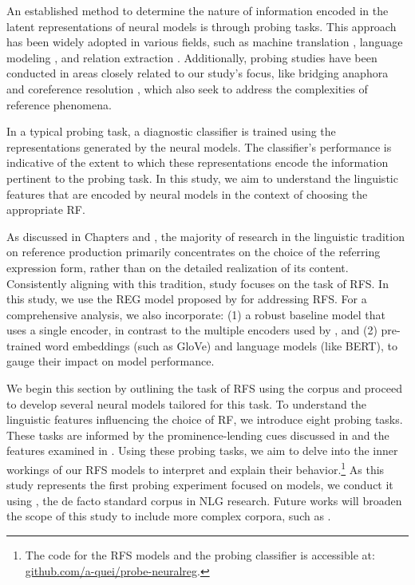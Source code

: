 An established method to determine the nature of information encoded in the latent representations of neural models is through probing tasks. This approach has been widely adopted in various fields, such as machine translation \citep{belinkov-etal-2017-neural}, language modeling \citep{giulianelli-etal-2018-hood}, and relation extraction \citep{alt-etal-2020-probing}. Additionally, probing studies have been conducted in areas closely related to our study's focus, like bridging anaphora and coreference resolution \citep{sorodoc-etal-2020-probing, pandit-hou-2021-probing}, which also seek to address the complexities of reference phenomena.

In a typical probing task, a diagnostic classifier is trained using the representations generated by the neural models. The classifier's performance is indicative of the extent to which these representations encode the information pertinent to the probing task. In this study, we aim to understand the linguistic features that are encoded by neural models in the context of choosing the appropriate RF.

As discussed in Chapters \2 and \5, the majority of research in the linguistic tradition on reference production primarily concentrates on the choice of the referring expression form, rather than on the detailed realization of its content. Consistently aligning with this tradition, study \studG focuses on the task of RFS. In this study, we use the REG model proposed by \citet{ferreira2018neuralreg} for addressing RFS. For a comprehensive analysis, we also incorporate: (1) a robust baseline model that uses a single encoder, in contrast to the multiple encoders used by \citet{ferreira2018neuralreg}, and (2) pre-trained word embeddings (such as GloVe) and language models (like BERT), to gauge their impact on model performance.

We begin this section by outlining the task of RFS using the \webnlg corpus and proceed to develop several neural models tailored for this task. To understand the linguistic features influencing the choice of RF, we introduce eight probing tasks. These tasks are informed by the prominence-lending cues discussed in  and the features examined in . Using these probing tasks, we aim to delve into the inner workings of our RFS models to interpret and explain their behavior.\footnote{The code for the RFS models and the probing classifier is accessible at: \url{github.com/a-quei/probe-neuralreg}.} As this study represents the first probing experiment focused on \context models, we conduct it using \webnlg, the de facto standard corpus in NLG research. Future works will broaden the scope of this study to include more complex corpora, such as \wsj.

